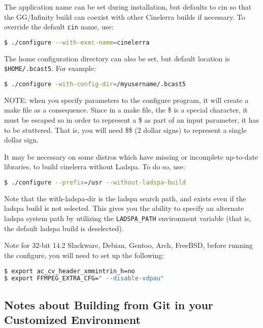 The application name can be set during installation, but defaults to cin so that the GG/Infinity build can coexist with other Cinelerra builds if necessary.  To override the default \texttt{cin} name, use:	
\begin{lstlisting}[language=bash,numbers=none]
$ ./configure --with-exec-name=cinelerra
\end{lstlisting}

The home configuration directory can also be set, but default location is \texttt{\$HOME/.bcast5}.  
For example:

\begin{lstlisting}[language=bash,numbers=none]
$ ./configure -with-config-dir=/myusername/.bcast5
\end{lstlisting}

NOTE:  when you specify parameters to the configure program, it will create a make file as a consequence.  
Since in a make file, the \$ is a special character, it must be escaped so in order to represent a \$ as part of an input parameter, it has to be stuttered.  
That is, you will need \$\$ (2 dollar signs) to represent a single dollar sign. 

It may be necessary on some distros which have missing or incomplete up-to-date libraries, to build cinelerra without Ladspa.  
To do so, use:

\begin{lstlisting}[language=bash,numbers=none]
$ ./configure --prefix=/usr --without-ladspa-build
\end{lstlisting}

Note that the with-ladspa-dir is the ladspa search path, and exists even if the ladspa build is not selected.  This gives you the ability to specify an alternate ladspa system path by utilizing the \texttt{LADSPA\_PATH} environment variable (that is, the default ladspa build is deselected).

Note for 32-bit 14.2 Slackware, Debian, Gentoo, Arch, FreeBSD, before running the configure, you will need to set up the following:

\begin{lstlisting}[language=bash,numbers=none]
$ export ac_cv_header_xmmintrin_h=no
$ export FFMPEG_EXTRA_CFG=" --disable-vdpau"
\end{lstlisting}

\subsection{Notes about Building from Git in your Customized Environment}%
\label{sub:notes_about_building_from_git_in_your_customized_environment}

